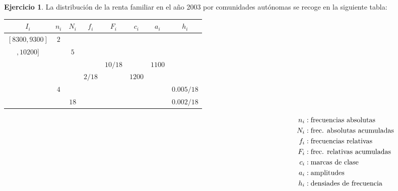 \documentclass[a4paper, 12pt]{article}
\theoremstyle{definition}
\newtheorem{ej}{Ejercicio}
\begin{document}
\begin{ej}
La distribución de la renta familiar en el año 2003 por comunidades autónomas se recoge en la siguiente tabla:

\begin{table}[!h]

    \begin{tabular}{|c|c|c|c|c|c|c|c|}
    \hline
     \(I_i\) & \(n_i\) & \(N_i \) & \(f_i \) & \(F_i\) & \(c_i\) & \(a_i\) & \(h_i\)  \\ \hline
     \([8300, 9300] \) & \(2 \) & & & & & &\\ 
     \(,10200] \) & & \(5 \) & & & & & \\ 
     & & & & \(10/18 \)  & & \(1100 \) &   \\ 
     & & & \(2/18 \) & & \(1200 \) & &  \\ 
     & \(4 \) & & & & & & \(0.005/18\) \\ 
     & & \(18 \) & & & & & \(0.002/18\) \\ 
     \hline
    \end{tabular}
  
\vspace*{-130pt}
    \begin{align*}
   \hspace{12.5cm} 
    n_i&: \text{frecuencias absolutas }\\
    N_i&: \text{frec. absolutas acumuladas} \\
    f_i&: \text{frecuencias relativas} \\ 
    F_i&: \text{frec. relativas acumuladas} \\
    c_i&: \text{marcas de clase} \\
    a_i&: \text{amplitudes} \\
    h_i&: \text{densiades de frecuencia}
    \end{align*}
\end{table}

\begin{center}
\end{center}


\end{ej}
\end{document}
